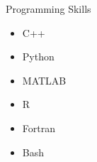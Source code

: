 \documentclass{resume} %
\begin{document}
\begin{rSection}{Programming Skills}
  \begin{multicols}{6}
    \begin{itemize}
    \setlength\itemsep{-0.75em}
    \item C++  
    \item Python
    \item MATLAB
    \item R
    \item Fortran
    \item Bash
    \end{itemize}
  \end{multicols}
    
\end{rSection}

\end{document}
